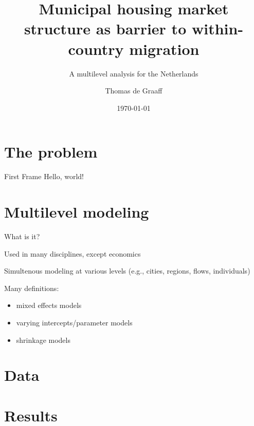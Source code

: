 \documentclass{beamer}
\title{Municipal housing market structure as barrier to within-country migration}
\subtitle{A multilevel analysis for the Netherlands}
\date{\today}
\author{Thomas de Graaff}
\institute{Vrije Universiteit Amsterdam\\Department of Spatial Economics}
\begin{document}
\maketitle

\section{The problem}

  \begin{frame}{First Frame}
    Hello, world!
  \end{frame}

  \section{Multilevel modeling}

  \begin{frame}{What is it?}

    Used in many disciplines, except economics

    Simultenous modeling at various levels (e.g., cities, regions, flows, individuals)

    Many definitions:
    \begin{itemize}
    \item mixed effects models
    \item varying intercepts/parameter models
    \item shrinkage models
          \end{itemize}
    
  \end{frame}

  \section{Data}


  \section{Results}
\end{document}
